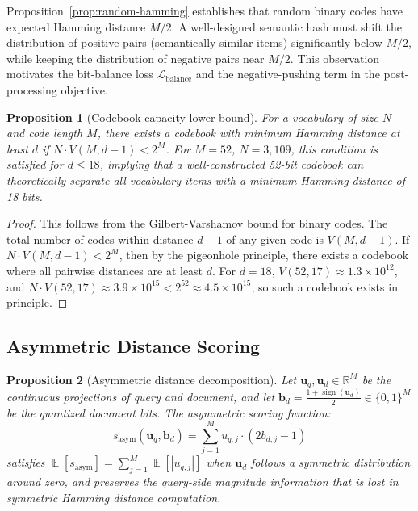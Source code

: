 \documentclass[11pt,a4paper]{article}
\newtheorem{proposition}{Proposition}
\DeclareMathOperator{\sign}{sign}
\DeclareMathOperator{\E}{\mathbb{E}}
\begin{document}
Proposition~\ref{prop:random-hamming} establishes that random binary codes have expected Hamming distance $M/2$. A well-designed semantic hash must shift the distribution of positive pairs (semantically similar items) significantly below $M/2$, while keeping the distribution of negative pairs near $M/2$. This observation motivates the bit-balance loss $\mathcal{L}_{\text{balance}}$ and the negative-pushing term in the post-processing objective.

\begin{proposition}[Codebook capacity lower bound]\label{prop:capacity}
For a vocabulary of size $N$ and code length $M$, there exists a codebook with minimum Hamming distance at least $d$ if $N \cdot V(M, d-1) < 2^M$. For $M=52$, $N=3{,}109$, this condition is satisfied for $d \leq 18$, implying that a well-constructed 52-bit codebook can theoretically separate all vocabulary items with a minimum Hamming distance of 18 bits.
\end{proposition}

\begin{proof}
This follows from the Gilbert-Varshamov bound for binary codes. The total number of codes within distance $d-1$ of any given code is $V(M, d-1)$. If $N \cdot V(M, d-1) < 2^M$, then by the pigeonhole principle, there exists a codebook where all pairwise distances are at least $d$. For $d=18$, $V(52,17) \approx 1.3 \times 10^{12}$, and $N \cdot V(52,17) \approx 3.9 \times 10^{15} < 2^{52} \approx 4.5 \times 10^{15}$, so such a codebook exists in principle.
\end{proof}

\subsection{Asymmetric Distance Scoring}

\begin{proposition}[Asymmetric distance decomposition]\label{prop:asym}
Let $\mathbf{u}_q, \mathbf{u}_d \in \mathbb{R}^M$ be the continuous projections of query and document, and let $\mathbf{b}_d = \frac{1 + \sign(\mathbf{u}_d)}{2} \in \{0,1\}^M$ be the quantized document bits. The asymmetric scoring function:
\begin{equation}
    s_{\text{asym}}(\mathbf{u}_q, \mathbf{b}_d) = \sum_{j=1}^{M} u_{q,j} \cdot (2 b_{d,j} - 1)
\end{equation}
satisfies $\E[s_{\text{asym}}] = \sum_{j=1}^{M} \E[|u_{q,j}|]$ when $\mathbf{u}_d$ follows a symmetric distribution around zero, and preserves the query-side magnitude information that is lost in symmetric Hamming distance computation.
\end{proposition}
\end{document}
